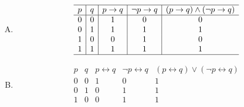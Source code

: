 {{\begin{practices}
\begin{enumerate}[A.]
{\begin{table}[H]
\[\begin{array}{c|c|c|c|c}
                                \hline
                                0 & 0 & 1 & 0 & 1 \\
                                0 & 1 & 1 & 1 & 1 \\
                                1 & 0 & 0 & 1 & 1 \\
                                1 & 1 & 1 & 1 & 1 \\
                                \hline
                            \end{array}
                        \]
                    \end{table}
                }
                \item
                {
                    \begin{table}[H]
                        \[
                            \begin{array}{c|c|c|c|c}
                                \hline
                                p & q & p \rightarrow q & \neg p \rightarrow q & (p \rightarrow q) \wedge (\neg p \rightarrow q) \\
                                \hline
                                0 & 0 & 1 & 0 & 0 \\
                                0 & 1 & 1 & 1 & 1 \\
                                1 & 0 & 0 & 1 & 0 \\
                                1 & 1 & 1 & 1 & 1 \\
                                \hline
                            \end{array}
                        \]
                    \end{table}
                }
                \item
                {
                    \begin{table}[H]
                        \[
                            \begin{array}{c|c|c|c|c}
                                \hline
                                p & q & p \leftrightarrow q & \neg p \leftrightarrow q & (p \leftrightarrow q) \vee (\neg p \leftrightarrow q) \\
                                \hline
                                0 & 0 & 1 & 0 & 1 \\
                                0 & 1 & 0 & 1 & 1 \\
                                1 & 0 & 0 & 1 & 1 \\

\end{array}\]
\end{table}}
\end{enumerate}
\end{practices}}}
